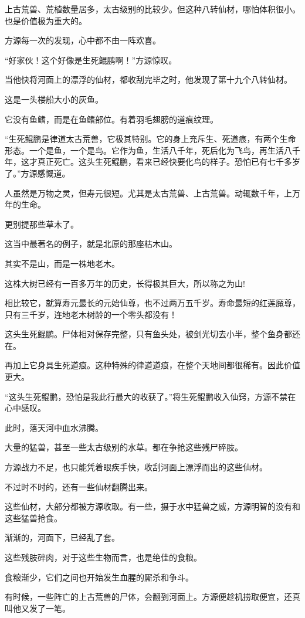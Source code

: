 \begin{this_body}
上古荒兽、荒植数量居多，太古级别的比较少。但这种八转仙材，哪怕体积很小。也是价值极为重大的。

方源每一次的发现，心中都不由一阵欢喜。

“好家伙！这个好像是生死鲲鹏啊！”方源惊叹。

当他快将河面上的漂浮的仙材，都收刮完毕之时，他发现了第十九个八转仙材。

这是一头楼船大小的灰鱼。

它没有鱼鳍，而是在鱼鳍部位。有着羽毛翅膀的道痕纹理。

“生死鲲鹏是律道太古荒兽，它极其特别。它的身上充斥生、死道痕，有两个生命形态。一个是鱼，一个是鸟。它作为鱼，生活八千年，死后化为飞鸟，再生活八千年，这才真正死亡。这头生死鲲鹏，看来已经快要化鸟的样子。恐怕已有七千多岁了。”方源感慨道。

人虽然是万物之灵，但寿元很短。尤其是太古荒兽、上古荒兽。动辄数千年，上万年的生命。

更别提那些草木了。

这当中最著名的例子，就是北原的那座枯木山。

其实不是山，而是一株地老木。

这株大树已经有一百多万年的历史，长得极其巨大，所以称之为山!

相比较它，就算寿元最长的元始仙尊，也不过两万五千岁。寿命最短的红莲魔尊，只有三千岁，连地老木树龄的一个零头都没有！

这头生死鲲鹏。尸体相对保存完整，只有鱼头处，被剑光切去小半，整个鱼身都还在。

再加上它身具生死道痕。这种特殊的律道道痕，在整个天地间都很稀有。因此价值更大。

“这头生死鲲鹏，恐怕是我此行最大的收获了。”将生死鲲鹏收入仙窍，方源不禁在心中感叹。

此时，落天河中血水沸腾。

大量的猛兽，甚至一些太古级别的水草。都在争抢这些残尸碎肢。

方源战力不足，也只能凭着眼疾手快，收刮河面上漂浮而出的这些仙材。

不过时不时的，还有一些仙材翻腾出来。

这些仙材，大部分都被方源收取。有一些，摄于水中猛兽之威，方源明智的没有和这些猛兽抢食。

渐渐的，河面下，已经乱了套。

这些残肢碎肉，对于这些生物而言，也是绝佳的食粮。

食粮渐少，它们之间也开始发生血腥的厮杀和争斗。

有时候，一些阵亡的上古荒兽的尸体，会翻到河面上。方源便趁机捞取便宜，还真叫他又发了一笔。


\end{this_body}
